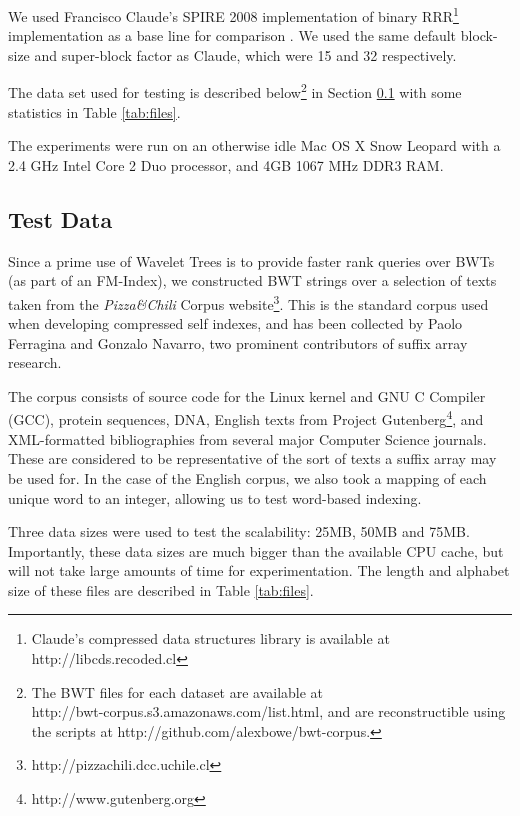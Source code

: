 We used Francisco Claude's SPIRE 2008 implementation of binary 
RRR\footnote{Claude's compressed data 
structures library is available at http://libcds.recoded.cl} implementation as a 
base line for comparison \cite{claude2008}. We used the same default block-size 
and super-block factor as Claude, which were 15 and 32 respectively.

The data set used for testing is described below\footnote{The BWT files for each 
dataset are 
available at\\ http://bwt-corpus.s3.amazonaws.com/list.html, and are 
reconstructible using the scripts at http://github.com/alexbowe/bwt-corpus.} in 
Section \ref{sec:data} with some statistics in Table \ref{tab:files}.

The experiments were run on an otherwise idle Mac OS X Snow Leopard with a 2.4 
GHz Intel Core 2 Duo processor, and 4GB 1067 MHz DDR3 RAM.

\pagebreak
\subsection{Test Data}
\label{sec:data}
Since a prime use of Wavelet Trees is to provide faster rank queries over BWTs 
(as part of an FM-Index), we
constructed BWT strings over a selection of texts taken from the 
\emph{Pizza\&Chili}
Corpus website\footnote{http://pizzachili.dcc.uchile.cl}. This is the standard
corpus used when developing compressed self indexes, and has been collected by
Paolo Ferragina and Gonzalo Navarro, two prominent contributors of suffix array 
research.

The corpus consists of source code for the Linux kernel and GNU C Compiler
(GCC), protein sequences, DNA, English texts from Project
Gutenberg\footnote{http://www.gutenberg.org}, and XML-formatted bibliographies
from several major Computer Science journals. These are considered to be
representative of the sort of texts a suffix array may be used for. In the 
case of the English corpus, we also took a mapping of each unique word to an 
integer, allowing us to test word-based indexing.

Three data sizes were used to test the scalability: 25MB, 50MB and 75MB. 
Importantly, these data sizes are much bigger than the available CPU cache, but
will not take large amounts of time for experimentation. The length and alphabet 
size of these files are described in Table \ref{tab:files}.

